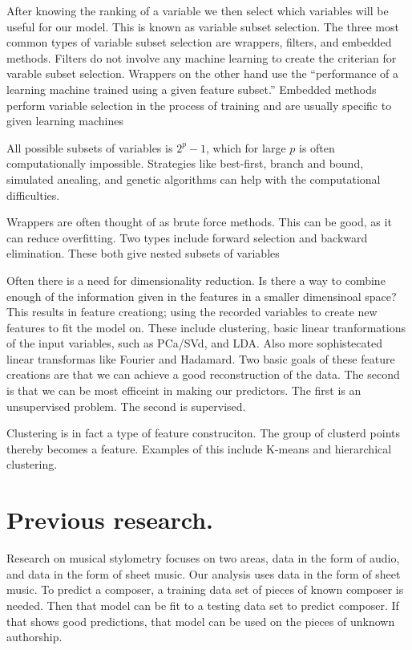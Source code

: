 \documentclass[12pt,twoside]{reedthesis}
\theoremstyle{definition}
\theoremstyle{definition}
\theoremstyle{definition}
\theoremstyle{remark}
\begin{document}
After knowing the ranking of a variable we then select which variables
will be useful for our model. This is known as variable subset
selection. The three most common types of variable subset selection are
wrappers, filters, and embedded methods. Filters do not involve any
machine learning to create the criterian for varable subset selection.
Wrappers on the other hand use the ``performance of a learning machine
trained using a given feature subset.'' Embedded methods perform
variable selection in the process of training and are usually specific
to given learning machines

All possible subsets of variables is \(2^p-1\), which for large \(p\) is
often computationally impossible. Strategies like best-first, branch and
bound, simulated anealing, and genetic algorithms can help with the
computational difficulties.

Wrappers are often thought of as brute force methods. This can be good,
as it can reduce overfitting. Two types include forward selection and
backward elimination. These both give nested subsets of variables

Often there is a need for dimensionality reduction. Is there a way to
combine enough of the information given in the features in a smaller
dimensinoal space? This results in feature creationg; using the recorded
variables to create new features to fit the model on. These include
clustering, basic linear tranformations of the input variables, such as
PCa/SVd, and LDA. Also more sophistecated linear transformas like
Fourier and Hadamard. Two basic goals of these feature creations are
that we can achieve a good reconstruction of the data. The second is
that we can be most efficeint in making our predictors. The first is an
unsupervised problem. The second is supervised.

Clustering is in fact a type of feature construciton. The group of
clusterd points thereby becomes a feature. Examples of this include
K-means and hierarchical clustering.

\section{Previous research.}\label{previous-research.}

Research on musical stylometry focuses on two areas, data in the form of
audio, and data in the form of sheet music. Our analysis uses data in
the form of sheet music. To predict a composer, a training data set of
pieces of known composer is needed. Then that model can be fit to a
testing data set to predict composer. If that shows good predictions,
that model can be used on the pieces of unknown authorship.
\end{document}
